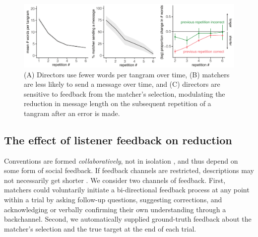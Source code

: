 \documentclass[alpha-refs]{wiley-article}
\begin{document}
\begin{figure}[t]
\centering
\includegraphics[scale=.64]{listenerFeedback_combined.pdf}
\caption{(A) Directors use fewer words per tangram over time, (B) matchers are less likely to send a message over time, and (C) directors are sensitive to feedback from the matcher's selection, modulating the reduction in message length on the subsequent repetition of a tangram after an error is made.}
\label{fig:feedback}
\end{figure}

\subsection{The effect of listener feedback on reduction}\label{listener-feedback}

Conventions are formed \emph{collaboratively}, not in isolation \citep{ClarkWilkesGibbs86_ReferringCollaborative}, and thus depend on some form of social feedback.
If feedback channels are restricted, descriptions may not necessarily get shorter \citep{KraussWeinheimer66_Tangrams, GarrodFayLeeOberlanderMacLeod07_GraphicalSymbolSystems}.
We consider two channels of feedback.
First, matchers could voluntarily initiate a bi-directional feedback process at any point within a trial by asking follow-up questions, suggesting corrections, and acknowledging or verbally confirming their own understanding through a backchannel.
Second, we automatically supplied ground-truth feedback about the matcher's selection and the true target at the end of each trial.
\end{document}
